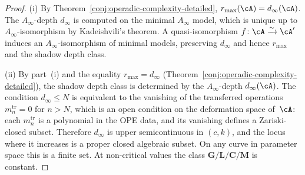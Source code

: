 \begin{proof}
\textup{(i)}
By Theorem~\textup{\ref{conj:operadic-complexity-detailed}},
$r_{\max}(\cA) = d_\infty(\cA)$.
The $A_\infty$-depth $d_\infty$ is computed on the minimal
$A_\infty$ model, which is unique up to $A_\infty$-isomorphism
by Kadeishvili's theorem.  A quasi-isomorphism
$f\colon \cA \xrightarrow{\sim} \cA'$ induces an
$A_\infty$-isomorphism of minimal models, preserving $d_\infty$
and hence $r_{\max}$ and the shadow depth class.

\smallskip\noindent\textup{(ii)}
By part~(i) and the equality $r_{\max} = d_\infty$
(Theorem~\ref{conj:operadic-complexity-detailed}), the shadow
depth class is determined by the $A_\infty$-depth
$d_\infty(\cA)$.  The condition $d_\infty \leq N$ is
equivalent to the vanishing of the transferred operations
$m_n^{\mathrm{tr}} = 0$ for $n > N$, which is an open
condition on the deformation space of~$\cA$: each
$m_n^{\mathrm{tr}}$ is a polynomial in the OPE data, and
its vanishing defines a Zariski-closed subset.
Therefore $d_\infty$ is upper semicontinuous in $(c,k)$,
and the locus where it increases is a proper closed
algebraic subset.  On any curve in parameter space this
is a finite set.  At non-critical values the class
$\mathbf{G}/\mathbf{L}/\mathbf{C}/\mathbf{M}$ is constant.
\end{proof}

